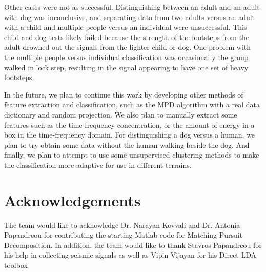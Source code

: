\documentclass{article}[11pt]
\begin{document}
Other cases were not as successful.  Distinguishing between an adult and an adult with dog was inconclusive, and separating data from two adults versus an adult with a child and multiple people versus an individual were unsuccessful.  This child and dog tests likely failed because the strength of the footsteps from the adult drowned out the signals from the lighter child or dog.  One problem with the multiple people versus individual classification was occasionally the group walked in lock step, resulting in the signal appearing to have one set of heavy footsteps. 

In the future, we plan to continue this work by developing other methods of feature extraction and classification, such as the MPD algorithm with a real data dictionary and random projection.  We also plan to manually extract some features such as the time-frequency concentration, or the amount of energy in a box in the time-frequency domain.  For distinguishing a dog versus a human, we plan to try obtain some data without the human walking beside the dog.  And finally, we plan to attempt to use some unsupervised clustering methods to make the classification more adaptive for use in different terrains.

\section{Acknowledgements}
\label{sec:Ack}
The team would like to acknowledge Dr. Narayan Kovvali and Dr. Antonia Papandreou for contributing the starting Matlab code for Matching Pursuit Decomposition.  In addition, the team would like to thank Stavros Papandreou for his help in collecting seismic signals as well as Vipin Vijayan for his Direct LDA toolbox \cite{Vijayan}




\end{document}
